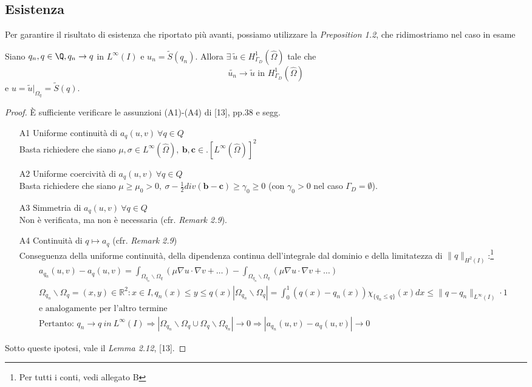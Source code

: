 \subsection{Esistenza}
Per garantire il risultato di esistenza che riportato pi\`u avanti, possiamo utilizzare la \emph{Preposition 1.2}, che ridimostriamo nel caso in esame
\begin{prop}
 Siano $q_n,q\in\Q,q_n\to q$ in $L^\infty(I)$ e $u_n=\tilde{S}(q_n)$. Allora $\exists\ \tilde{u}\in H^1_{\Gamma_D}(\hat{\Omega})$ tale che $$\tilde{u_n}\to\tilde{u}\text{ in }H^1_{\Gamma_D}(\hat{\Omega})$$
e $u=\tilde{u}|_{\Omega_q}=\tilde{S}(q)$.
\label{p:Scont}
\end{prop}
\begin{proof}
	\`E sufficiente verificare le assunzioni (A1)-(A4) di [13], pp.38 e segg.
	\begin{itemize}
		\item[A1] Uniforme continuit\`a di $a_q(u,v)\ \forall q\in Q$\\
			Basta richiedere che siano $\mu,\sigma\in L^\infty(\hat\Omega),\ \mathbf{b},\mathbf{c}\in. \left[L^\infty(\hat\Omega)\right]^2$
		\item[A2] Uniforme coercivit\`a di $a_q(u,v)\ \forall q\in Q$\\
			Basta richiedere che siano $\mu\geq\mu_0>0,\ \sigma-\frac{1}{2}div(\mathbf{b}-\mathbf{c})\geq\gamma_0\geq0$ (con $\gamma_0>0$ nel caso $\Gamma_D=\emptyset$).
		\item[A3] Simmetria di $a_q(u,v)\ \forall q\in Q$\\Non \`e verificata, ma non \`e necessaria (cfr. \emph{Remark 2.9}).
		\item[A4] Continuit\`a di $q\mapsto a_q$ (cfr. \emph{Remark 2.9})\\
			Conseguenza della uniforme continuit\`a, della dipendenza continua dell'integrale dal dominio e della limitatezza di $\|q\|_{H^2(I)}$:\footnote{Per tutti i conti, vedi allegato B}
			\begin{gather*}
				a_{q_n}(u,v)-a_q(u,v) =\int_{\Omega_{q_n}\smallsetminus\Omega_q}{(\mu\nabla u\cdot\nabla v + \dots)} - \int_{\Omega_{q_n}\smallsetminus\Omega_q}{(\mu\nabla u\cdot\nabla v +\dots)} \\
				\Omega_{q_n}\smallsetminus\Omega_q={(x,y)\in\mathds{R}^2: x\in I, q_n(x)\leq y\leq q(x)}
				|\Omega_{q_n}\smallsetminus\Omega_q| =\int_0^1{(q(x)-q_n(x))\chi_{\{q_n\leq q\}}(x) dx}\leq\|q-q_n\|_{L^\infty(I)}\cdot1\\
				\text{e analogamente per l'altro termine}\\
				\text{Pertanto: } q_n\to q\ in\ L^\infty(I) \Rightarrow |\Omega_{q_n}\smallsetminus\Omega_q \cup \Omega_q\smallsetminus\Omega_{q_n}| \to 0 \Rightarrow |a_{q_n}(u,v)-a_q(u,v)|\to 0
			\end{gather*}
			
	\end{itemize}
	Sotto queste ipotesi, vale il \emph{Lemma 2.12}, [13].
\end{proof}

